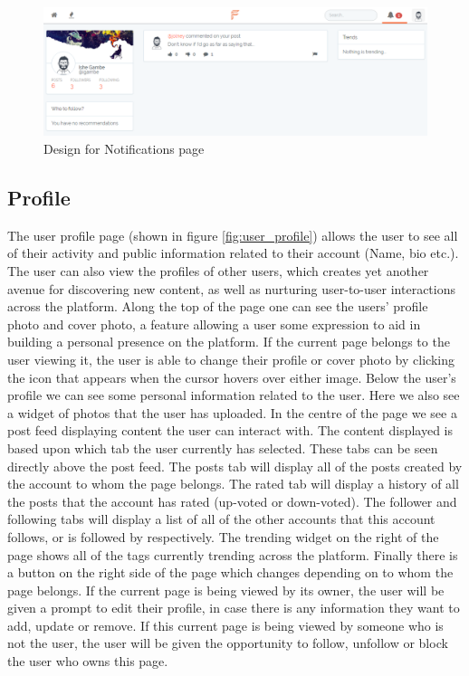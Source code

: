 \begin{figure}[H]
\centering
\includegraphics[width=1\linewidth]{Images/Design/notifications-page}
\caption{Design for Notifications page}
\label{fig:notifications-page}
\end{figure}

\subsection{Profile}
The user profile page (shown in figure \ref{fig:user_profile}) allows the user to see all of their activity and public information related to their account (Name, bio etc.). The user can also view the profiles of other users, which creates yet another avenue for discovering new content, as well as nurturing user-to-user interactions across the platform. Along the top of the page one can see the users' profile photo and cover photo, a feature allowing a user some expression to aid in building a personal presence on the platform. If the current page belongs to the user viewing it, the user is able to change their profile or cover photo by clicking the icon that appears when the cursor hovers over either image. Below the user's profile we can see some personal information related to the user. Here we also see a widget of photos that the user has uploaded. In the centre of the page we see a post feed displaying content the user can interact with. The content displayed is based upon which tab the user currently has selected. These tabs can be seen directly above the post feed. The posts tab will display all of the posts created by the account to whom the page belongs. The rated tab will display a history of all the posts that the account has rated (up-voted or down-voted). The follower and following tabs will display a list of all of the other accounts that this account follows, or is followed by respectively. The trending widget on the right of the page shows all of the tags currently trending across the platform. Finally there is a button on the right side of the page which changes depending on to whom the page belongs. If the current page is being viewed by its owner, the user will be given a prompt to edit their profile, in case there is any information they want to add, update or remove. If this current page is being viewed by someone who is not the user, the user will be given the opportunity to follow, unfollow or block the user who owns this page.

